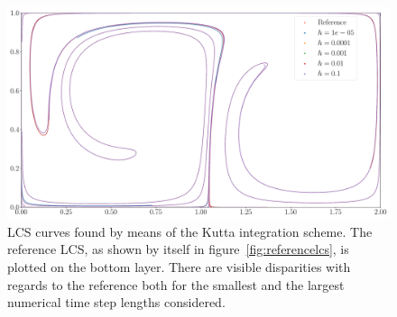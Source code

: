 \begin{figure}[htpb]
    \centering
    \includegraphics[width=0.8\linewidth]{figures/lcs_figures/rk3.pdf}
    \caption[LCS curves found by means of the Kutta integration scheme]{
        LCS curves found by means of the Kutta integration scheme. The
        reference LCS, as shown by itself in figure~\ref{fig:referencelcs},
        is plotted on the bottom layer. There are visible disparities with
        regards to the reference both for the smallest and the largest numerical
        time step lengths considered.}
    \label{fig:lcs_rk3}
\end{figure}
